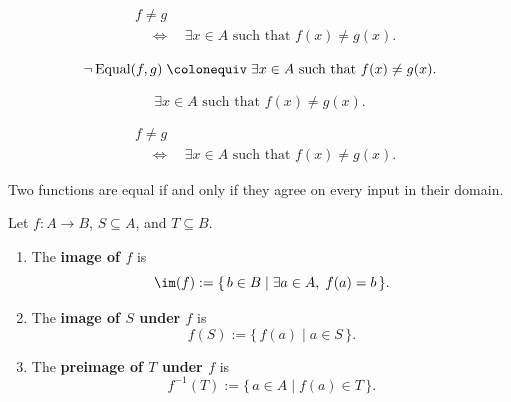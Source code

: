\begin{remark*}
\[
\begin{aligned}
&f \ne g \\
&\quad\Longleftrightarrow\quad
\exists x \in A \text{ such that } f(x) \ne g(x).
\end{aligned}
\]
\end{remark*}

\begin{remark*}
\[
\neg \operatorname{Equal}(f,g)
\;\colonequiv\;
\exists x \in A \text{ such that } f(x) \ne g(x).
\]
\end{remark*}

\begin{remark*}
\[
\exists x \in A \text{ such that } f(x) \ne g(x).
\]
\end{remark*}

\begin{remark*}
\[
\begin{aligned}
&f \ne g \\
&\quad\Longleftrightarrow\quad
\exists x \in A \text{ such that } f(x) \ne g(x).
\end{aligned}
\]
\end{remark*}

\begin{remark*}[Interpretation]
Two functions are equal if and only if they agree on every input in their domain.
\end{remark*}





\begin{tcolorbox}[title={Definition --- Image / Preimage}]
\begin{definition}
\label{def:alg-image}
Let $f : A \to B$, $S \subseteq A$, and $T \subseteq B$.
\begin{enumerate}[label=(\roman*)]
  \item The \textbf{image of $f$} is
        \[
          \im(f) := \{\, b \in B \mid \exists a \in A,\; f(a) = b \,\}.
        \]
  \item The \textbf{image of $S$ under $f$} is
        \[
          f(S) := \{\, f(a) \mid a \in S \,\}.
        \]
  \item The \textbf{preimage of $T$ under $f$} is
        \[
          f^{-1}(T) := \{\, a \in A \mid f(a) \in T \,\}.
        \]
\end{enumerate}
\end{definition}
\end{tcolorbox}

